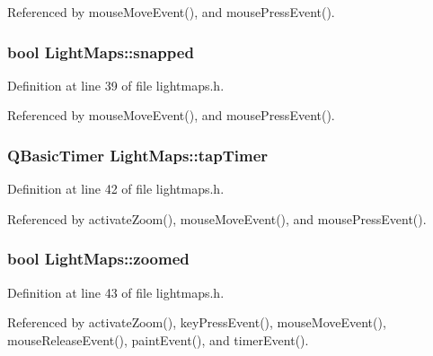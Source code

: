 Referenced by mouse\-Move\-Event(), and mouse\-Press\-Event().

\hypertarget{classLightMaps_a573f99d2f902a8b0b53ec7f7a5207775}{
\subsubsection[{snapped}]{\setlength{\rightskip}{0pt plus 5cm}bool Light\-Maps\-::snapped\hspace{0.3cm}{\ttfamily [private]}}}\label{classLightMaps_a573f99d2f902a8b0b53ec7f7a5207775}


Definition at line 39 of file lightmaps.\-h.



Referenced by mouse\-Move\-Event(), and mouse\-Press\-Event().

\hypertarget{classLightMaps_a5a537b004e79b6d8667d5550c0e3af07}{
\subsubsection[{tap\-Timer}]{\setlength{\rightskip}{0pt plus 5cm}Q\-Basic\-Timer Light\-Maps\-::tap\-Timer\hspace{0.3cm}{\ttfamily [private]}}}\label{classLightMaps_a5a537b004e79b6d8667d5550c0e3af07}


Definition at line 42 of file lightmaps.\-h.



Referenced by activate\-Zoom(), mouse\-Move\-Event(), and mouse\-Press\-Event().

\hypertarget{classLightMaps_a3ecc8b8c64dfe20dd5bdfc7974ac48e3}{
\subsubsection[{zoomed}]{\setlength{\rightskip}{0pt plus 5cm}bool Light\-Maps\-::zoomed\hspace{0.3cm}{\ttfamily [private]}}}\label{classLightMaps_a3ecc8b8c64dfe20dd5bdfc7974ac48e3}


Definition at line 43 of file lightmaps.\-h.



Referenced by activate\-Zoom(), key\-Press\-Event(), mouse\-Move\-Event(), mouse\-Release\-Event(), paint\-Event(), and timer\-Event().

